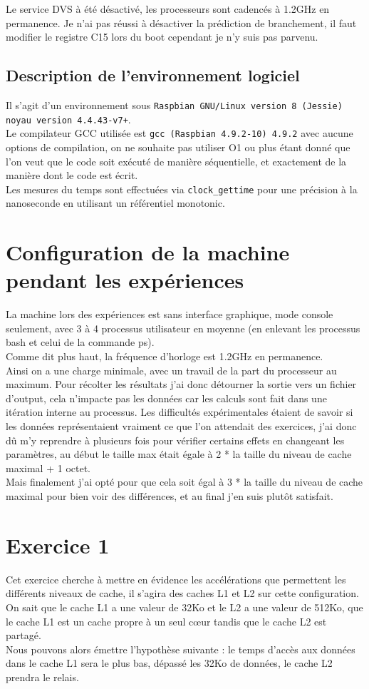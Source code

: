\documentclass[11pt,a4paper]{article}
\begin{document}
Le service DVS à été désactivé, les processeurs sont cadencés à 1.2GHz en permanence.
Je n'ai pas réussi à désactiver la prédiction de branchement, il faut modifier le registre C15 lors du boot cependant je n'y suis pas parvenu.

\subsection{Description de l'environnement logiciel}

Il s'agit d'un environnement sous \texttt{Raspbian GNU/Linux version 8 (Jessie) noyau version 4.4.43-v7+}.\\
Le compilateur GCC utilisée est \texttt{gcc (Raspbian 4.9.2-10) 4.9.2} avec aucune options de compilation, on ne souhaite pas utiliser O1 ou plus étant donné que l'on veut que le code soit exécuté de manière séquentielle, et exactement de la manière dont le code est écrit.\\
Les mesures du temps sont effectuées via \texttt{clock\_gettime} pour une précision à la nanoseconde en utilisant un référentiel monotonic.
\pagebreak
\section{Configuration de la machine pendant les expériences}

La machine lors des expériences est sans interface graphique, mode console seulement, avec 3 à 4 processus utilisateur en moyenne (en enlevant les processus bash et celui de la commande ps).\\
Comme dit plus haut, la fréquence d'horloge est 1.2GHz en permanence.\\
Ainsi on a une charge minimale, avec un travail de la part du processeur au maximum. Pour récolter les résultats j'ai donc détourner la sortie vers un fichier d'output, cela n'impacte pas les données car les calculs sont fait dans une itération interne au processus. Les difficultés expérimentales étaient de savoir si les données représentaient vraiment ce que l'on attendait des exercices, j'ai donc dû m'y reprendre à plusieurs fois pour vérifier certains effets en changeant les paramètres, au début le taille max était égale à 2 * la taille du niveau de cache maximal + 1 octet. \\Mais finalement j'ai opté pour que cela soit égal à 3 * la taille du niveau de cache maximal pour bien voir des différences, et au final j'en suis plutôt satisfait.

\section{Exercice 1}
Cet exercice cherche à mettre en évidence les accélérations que permettent les différents niveaux de cache, il s'agira des caches L1 et L2 sur cette configuration. \\
On sait que le cache L1 a une valeur de 32Ko et le L2 a une valeur de 512Ko, que le cache L1 est un cache propre à un seul cœur tandis que le cache L2 est partagé.\\
Nous pouvons alors émettre l'hypothèse suivante : le temps d'accès aux données dans le cache L1 sera le plus bas, dépassé les 32Ko de données, le cache L2 prendra le relais.
\end{document}
